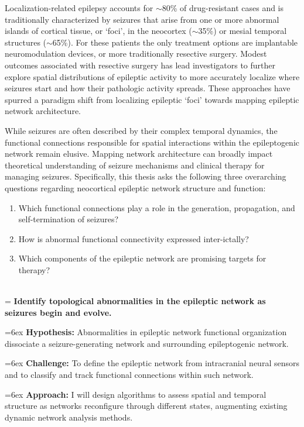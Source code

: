 Localization-related epilepsy accounts for $\sim$80\% of drug-resistant cases and is traditionally characterized by seizures that arise from one or more abnormal islands of cortical tissue, or `foci', in the neocortex ($\sim$35\%) or mesial temporal structures ($\sim$65\%). For these patients the only treatment options are implantable neuromodulation devices, or more traditionally resective surgery. Modest outcomes associated with resective surgery has lead investigators to further explore spatial distributions of epileptic activity to more accurately localize where seizures start and how their pathologic activity spreads. These approaches have spurred a paradigm shift from localizing epileptic ‘foci’ towards mapping epileptic network architecture.

While seizures are often described by their complex temporal dynamics, the functional connections responsible for spatial interactions within the epileptogenic network remain elusive. Mapping network architecture can broadly impact theoretical understanding of seizure mechanisms and clinical therapy for managing seizures. Specifically, this thesis asks the following three overarching questions regarding neocortical epileptic network structure and function:
\begin{enumerate}[topsep=1ex, itemsep=0pt]
    \item Which functional connections play a role in the generation, propagation, and self-termination of seizures?
    \item How is abnormal functional connectivity expressed inter-ictally?
    \item Which components of the epileptic network are promising targets for therapy?
\end{enumerate}

~\\
\hangindent=\parindent
{}
\noindent
{} \textbf{Identify topological abnormalities in the epileptic network as seizures begin and evolve.}

\hangindent=6ex
\textbf{Hypothesis:} Abnormalities in epileptic network functional organization dissociate a seizure-generating network and surrounding epileptogenic network.

\hangindent=6ex
\textbf{Challenge:} To define the epileptic network from intracranial neural sensors and to classify and track functional connections within such network.

\hangindent=6ex
\textbf{Approach:} I will design algorithms to assess spatial and temporal structure as networks reconfigure through different states, augmenting existing dynamic network analysis methods.

